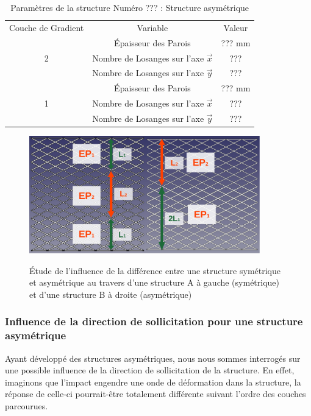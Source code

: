 \documentclass[a4paper]{article}
\begin{document}
	\begin{table}[H]
		\centering
		\begin{tabular}{|c|c|c|}
			\hline
			\rowcolor{Gray}
			\multicolumn{3}{c}{Structure de Référence}\\\hline
			\rowcolor{Gray}
			Couche de Gradient & Variable & Valeur\\
			\hline\hline
			& \textcolor[rgb]{1,0,0}{Épaisseur des Parois} & \textcolor[rgb]{1,0,0}{??? mm}\\
			\textcolor[rgb]{1,0,0}{2} & \textcolor[rgb]{1,0,0}{Nombre de Losanges sur l'axe $\vec{x}$} & \textcolor[rgb]{1,0,0}{???}\\
			& \textcolor[rgb]{1,0,0}{Nombre de Losanges sur l'axe $\vec{y}$} & \textcolor[rgb]{1,0,0}{???}\\
			\hline
			& \textcolor[rgb]{0,0.5,0}{Épaisseur des Parois} & \textcolor[rgb]{0,0.5,0}{??? mm}\\
			\textcolor[rgb]{0,0.5,0}{1} & \textcolor[rgb]{0,0.5,0}{Nombre de Losanges sur l'axe $\vec{x}$} & \textcolor[rgb]{0,0.5,0}{???}\\
			& \textcolor[rgb]{0,0.5,0}{Nombre de Losanges sur l'axe $\vec{y}$} & \textcolor[rgb]{0,0.5,0}{???}\\
			\hline
		\end{tabular}
		\caption{Paramètres de la structure Numéro ??? : Structure asymétrique}
	\end{table}
	
	\begin{figure}[H]
		\centering
		\includegraphics[width=10cm]{Images/6/symasym/symasym.pdf}\\
		\caption{Étude de l'influence de la différence entre une structure symétrique et asymétrique au travers d'une structure A à gauche (symétrique) et d'une structure B à droite (asymétrique)}
	\end{figure}
	\newpage
	
	\subsubsection{Influence de la direction de sollicitation pour une structure asymétrique}
	\hspace{0.5cm}Ayant développé des structures asymétriques, nous nous sommes interrogés sur une possible influence de la direction de sollicitation de la structure. En effet, imaginons que l'impact engendre une onde de déformation dans la structure, la réponse de celle-ci pourrait-être totalement différente suivant l'ordre des couches parcourues.\\ 
	
\end{document}
